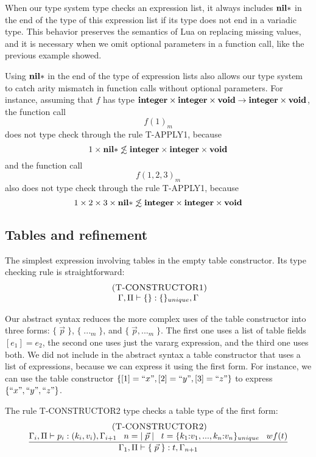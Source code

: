 When our type system type checks an expression list,
it always includes $\mathbf{nil}{*}$ in the end of the type of this expression list
if its type does not end in a variadic type.
This behavior preserves the semantics of Lua on replacing missing values,
and it is necessary when we omit optional parameters in a function call,
like the previous example showed.

Using $\mathbf{nil}{*}$ in the end of the type of expression lists also allows
our type system to catch arity mismatch in function calls without optional parameters.
For instance, assuming that $f$ has type
$\mathbf{integer} \times \mathbf{integer} \times \mathbf{void} \rightarrow \mathbf{integer} \times \mathbf{void}$,
the function call
\[
f(1)_{m}
\]
does not type check through the rule \textsc{T-APPLY1}, because
\[
1 \times \mathbf{nil}{*} \not\lesssim \mathbf{integer} \times \mathbf{integer} \times \mathbf{void}
\]
and the function call
\[
f(1,2,3)_{m}
\]
also does not type check through the rule \textsc{T-APPLY1}, because
\[
1 \times 2 \times 3 \times \mathbf{nil}{*} \not\lesssim \mathbf{integer} \times \mathbf{integer} \times \mathbf{void}
\]

\subsection{Tables and refinement}
\label{sec:refinement}

The simplest expression involving tables in the empty table constructor.
Its type checking rule is straightforward:
\[
\begin{array}{c}
\; (\textsc{T-CONSTRUCTOR1})\\
\Gamma, \Pi \vdash \{\}:\{\}_{unique}, \Gamma
\end{array}
\]

Our abstract syntax reduces the more complex uses of the table
constructor into three forms: $\{\;\vec{p}\;\}$, $\{\;{...}_{m}\;\}$,
and $\{\;\vec{p},{...}_{m}\;\}$.
The first one uses a list of table fields $[e_{1}] = e_{2}$,
the second one uses just the vararg expression, and the third one uses both.
We did not include in the abstract syntax a table constructor
that uses a list of expressions, because we can express it using the first form.
For instance, we can use the table constructor
$\{ [1] = ``x", [2] = ``y", [3] = ``z" \}$ to express $\{ ``x", ``y", ``z" \}$.

The rule \textsc{T-CONSTRUCTOR2} type checks a table type of the first form:
\[
\begin{array}{c}
\; (\textsc{T-CONSTRUCTOR2})\\
\dfrac{\Gamma_{i}, \Pi \vdash p_{i}:(k_{i},v_{i}), \Gamma_{i+1} \;\;\;
       n = |\;\vec{p}\;| \;\;\;
       t = \{k_{1}{:}v_{1}, ..., k_{n}{:}v_{n}\}_{unique} \;\;\;
       wf(t)}
      {\Gamma_{1}, \Pi \vdash \{\;\vec{p}\;\}:t, \Gamma_{n+1}}
\end{array}
\]


